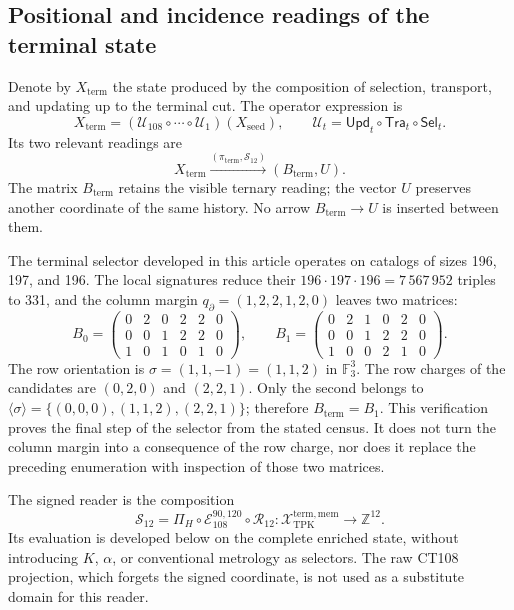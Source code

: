 \subsection{Positional and incidence readings of the terminal state}
\label{subsec:k-terminal}

Denote by \(X_{\mathrm{term}}\) the state produced by the composition of
selection, transport, and updating up to the terminal cut. The operator
expression is
\[
 X_{\mathrm{term}}=
 (\mathcal U_{108}\circ\cdots\circ\mathcal U_1)(X_{\mathrm{seed}}),
 \qquad \mathcal U_t=\mathsf{Upd}_t\circ\mathsf{Tra}_t\circ\mathsf{Sel}_t.
\]
Its two relevant readings are
\[
 X_{\mathrm{term}}
 \xrightarrow{(\pi_{\mathrm{term}},\mathcal S_{12})}
 (B_{\mathrm{term}},U).
\]
The matrix \(B_{\mathrm{term}}\) retains the visible ternary reading; the
vector \(U\) preserves another coordinate of the same history. No arrow
\(B_{\mathrm{term}}\to U\) is inserted between them.

The terminal selector developed in this article operates on catalogs of
sizes 196, 197, and 196. The local signatures reduce their
\(196\cdot197\cdot196=7\,567\,952\) triples to 331, and the column margin
\(q_{\partial}=(1,2,2,1,2,0)\) leaves two matrices:
\[
 B_0=\begin{pmatrix}0&2&0&2&2&0\\0&0&1&2&2&0\\1&0&1&0&1&0\end{pmatrix},
 \qquad
 B_1=\begin{pmatrix}0&2&1&0&2&0\\0&0&1&2&2&0\\1&0&0&2&1&0\end{pmatrix}.
\]
The row orientation is \(\sigma=(1,1,-1)=(1,1,2)\) in
\(\mathbb F_3^3\). The row charges of the candidates are \((0,2,0)\) and
\((2,2,1)\). Only the second belongs to
\(\langle\sigma\rangle=\{(0,0,0),(1,1,2),(2,2,1)\}\); therefore
\(B_{\mathrm{term}}=B_1\). This verification proves the final step of the
selector from the stated census. It does not turn the column margin into a
consequence of the row charge, nor does it replace the preceding enumeration
with inspection of those two matrices.

The signed reader is the composition
\begin{equation}
 \mathcal S_{12}
 =\Pi_H\circ\mathcal E_{108}^{90,120}\circ\mathcal R_{12}:
 \mathcal X_{\mathrm{TPK}}^{\mathrm{term,mem}}
 \longrightarrow\mathbb Z^{12}.
 \label{eq:k-lector-firmado}
\end{equation}
Its evaluation is developed below on the complete enriched state, without
introducing \(K\), \(\alpha\), or conventional metrology as
selectors. The raw CT108 projection, which forgets the signed coordinate, is
not used as a substitute domain for this reader.

